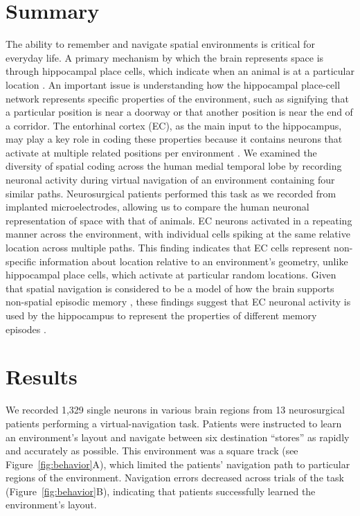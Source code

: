  

  
  
\section{Summary}

The ability to remember and navigate spatial environments is critical for everyday life. A primary mechanism by which the brain represents space is through hippocampal place cells, which indicate when an animal is at a particular location \citep{OKeeDost71}. An important issue is understanding how the hippocampal place-cell network represents specific properties of the environment, such as signifying that a particular position is near a doorway or that another position is near the end of a corridor. The entorhinal cortex (EC), as the main input to the hippocampus, may play a key role in coding these properties because it contains neurons that activate at multiple related positions per environment \cite{FranEtal00,HaftEtal05,DerdEtal09,SolsEtal08,BjerEtal14}.  We examined the diversity of spatial coding across the human medial temporal lobe by recording neuronal activity during virtual navigation of an environment containing four similar paths. Neurosurgical patients performed this task as we recorded from implanted microelectrodes, allowing us to compare the human neuronal representation of space with that of animals. EC neurons activated in a repeating manner across the environment, with individual cells spiking at the same relative location across multiple paths. This finding indicates that EC cells represent non-specific information about location relative to an environment's geometry, unlike hippocampal place cells, which activate at particular random locations. Given that spatial navigation is considered to be a model of how the brain supports non-spatial episodic memory \cite{EichLipt08,BirdBurg08,Hass12,BuzsMose13}, these findings suggest that EC neuronal activity is used by the hippocampus to represent the properties of different memory episodes \cite{FranEtal00,BuckEtal04}.




\section{Results}
We recorded 1,329 single neurons in various brain regions from 13 neurosurgical patients performing a virtual-navigation task.  Patients were instructed to learn an environment's layout and navigate between six destination ``stores''  as rapidly and accurately as possible. This environment was a square track (see Figure~\ref{fig:behavior}A), which limited the patients' navigation path to particular regions of the environment. Navigation errors decreased across trials of the task (Figure~\ref{fig:behavior}B), indicating that patients successfully learned the environment's layout.
  

